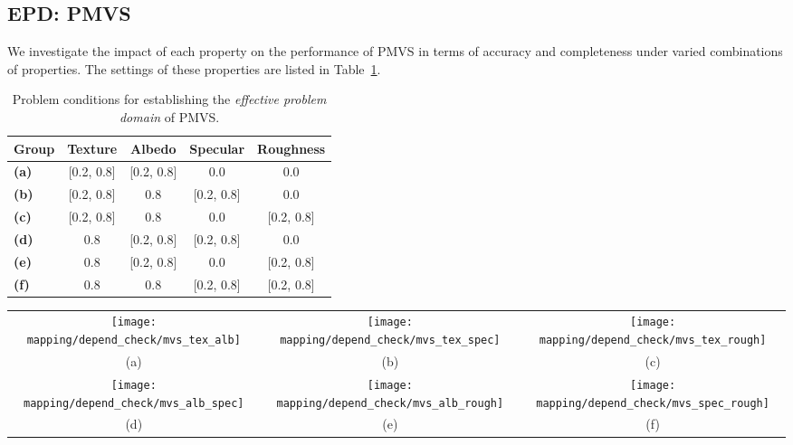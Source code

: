 \subsection{EPD: PMVS}
\label{sec:mvs_epd}
We investigate the impact of each property on the performance of PMVS in terms of accuracy and completeness under varied combinations of properties. The settings of these properties are listed in Table~\ref{tab:mvs_depend_check_params}.
\begin{table}[!htbp]
  \centering
  \begin{tabular}{l*{4}{c}}
  \hline
  \textbf{Group} & Texture & Albedo & Specular & Roughness\\
  \hline
  \textbf{(a)} & [0.2, 0.8] & [0.2, 0.8] & 0.0 & 0.0\\
  \textbf{(b)} & [0.2, 0.8] & 0.8 & [0.2, 0.8] & 0.0\\
  \textbf{(c)} & [0.2, 0.8] & 0.8 & 0.0 & [0.2, 0.8]\\
  \textbf{(d)} & 0.8 & [0.2, 0.8] & [0.2, 0.8] & 0.0\\
  \textbf{(e)} & 0.8 & [0.2, 0.8] & 0.0 & [0.2, 0.8]\\
  \textbf{(f)} & 0.8 & 0.8 & [0.2, 0.8] & [0.2, 0.8]\\
  \hline
  \end{tabular}
  \caption{Problem conditions for establishing the \textit{effective problem domain} of PMVS.}
  \label{tab:mvs_depend_check_params}
\end{table}

\begin{sidewaysfigure}[!htbp]
\begin{tabular}{ccc}
\texttt{[image: mapping/depend\_check/mvs\_tex\_alb]}&
\texttt{[image: mapping/depend\_check/mvs\_tex\_spec]}&
\texttt{[image: mapping/depend\_check/mvs\_tex\_rough]}\\
(a) & (b) & (c)\\
\texttt{[image: mapping/depend\_check/mvs\_alb\_spec]}&
\texttt{[image: mapping/depend\_check/mvs\_alb\_rough]}&
\texttt{[image: mapping/depend\_check/mvs\_spec\_rough]}\\
(d) & (e) & (f)\\
\end{tabular}
\caption{Performance of PMVS under six pairwise conditions. For instance, (a) shows the performance under changing \textit{texture} and \textit{albedo} values, while the others are fixed. The property values are set based on settings in Table~\ref{tab:mvs_depend_check_params}.}
\label{fig:mvs_depend_check}
\end{sidewaysfigure}

